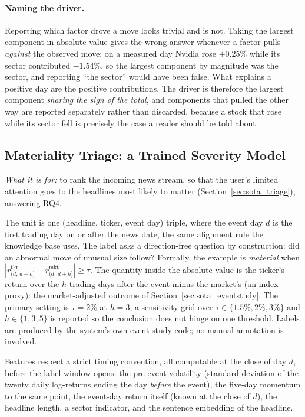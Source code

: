 \paragraph{Naming the driver.} Reporting which factor drove a move looks trivial and is not. Taking the
largest component in absolute value gives the wrong answer whenever a factor pulls \emph{against} the
observed move: on a measured day Nvidia rose $+0.25\%$ while its sector contributed $-1.54\%$, so the
largest component by magnitude was the sector, and reporting ``the sector'' would have been false. What
explains a positive day are the positive contributions. The driver is therefore the largest component
\emph{sharing the sign of the total}, and components that pulled the other way are reported separately
rather than discarded, because a stock that rose while its sector fell is precisely the case a reader
should be told about.

\subsection{Materiality Triage: a Trained Severity Model}
\label{sec:met_triage}

\emph{What it is for:} to rank the incoming news stream, so that the user's limited attention goes to
the headlines most likely to matter (Section~\ref{sec:sota_triage}), answering \gls{RQ}4.

The unit is one (headline, ticker, event day) triple, where the event day $d$ is the first trading day
on or after the news date, the same alignment rule the knowledge base uses. The label asks a
direction-free question by construction: did an abnormal move of unusual size follow? Formally, the
example is \emph{material} when $|r^{\mathrm{tkr}}_{(d,\,d+h]} - r^{\mathrm{mkt}}_{(d,\,d+h]}| \ge \tau$.
The quantity inside the absolute value is the ticker's return over the $h$ trading days after the
event minus the market's (an index proxy): the market-adjusted outcome of
Section~\ref{sec:sota_eventstudy}. The primary setting is $\tau = 2\%$ at
$h = 3$; a sensitivity grid over $\tau \in \{1.5\%, 2\%, 3\%\}$ and $h \in \{1, 3, 5\}$ is reported so
the conclusion does not hinge on one threshold. Labels are produced by the system's own event-study
code; no manual annotation is involved.

Features respect a strict timing convention, all computable at the close of day $d$, before the label
window opens: the pre-event volatility (standard deviation of the twenty daily log-returns ending the
day \emph{before} the event), the five-day momentum to the same point, the event-day return itself
(known at the close of $d$), the headline length, a sector indicator, and the sentence embedding of the
headline.

